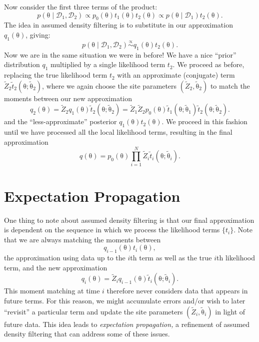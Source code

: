 \documentclass{article}
\newcommand{\given}{\mid}
\newcommand{\mc}[1]{\mathcal{#1}}
\newcommand{\data}{\mc{D}}
\renewcommand{\vec}[1]{\bm{\mathrm{#1}}}
\begin{document}
Now consider the first three terms of the product:
\[
  p(\vec{\theta} \given \data_1, \data_2)
  \propto
  p_0(\vec{\theta})
  t_1(\vec{\theta})
  t_2(\vec{\theta})
  \propto
  p(\vec{\theta} \given \data_1)
  t_2(\vec{\theta}).
\]
The idea in assumed density filtering is to substitute in our
approximation $q_1(\vec{\theta})$, giving:
\[
  p(\vec{\theta} \given \data_1, \data_2)
  \stackrel{\propto}{\sim}
  q_1(\vec{\theta})
  t_2(\vec{\theta}).
\]
Now we are in the same situation we were in before!  We have a nice
``prior'' distribution $q_1$ multiplied by a single likelihood term
$t_2$.  We proceed as before, replacing the true likelihood term $t_2$
with an approximate (conjugate) term $\tilde{Z}_2
\tilde{t}_2(\vec{\theta}; \tilde{\vec{\theta}}_2)$, where we again
choose the site parameters $(\tilde{Z}_2, \tilde{\vec{\theta}}_2)$ to
match the moments between our new approximation
\[
  q_2(\vec{\theta})
  =
  \tilde{Z}_2
  q_1(\vec{\theta})
  \tilde{t}_2(\vec{\theta}; \tilde{\vec{\theta}}_2)
  =
  \tilde{Z}_1
  \tilde{Z}_2
  p_0(\vec{\theta})
  \tilde{t}_1(\vec{\theta}; \tilde{\vec{\theta}}_1)
  \tilde{t}_2(\vec{\theta}; \tilde{\vec{\theta}}_2).
\]
and the ``less-approximate'' posterior
$q_1(\vec{\theta})t_2(\vec{\theta})$.  We proceed in this fashion
until we have processed all the local likelihood terms, resulting
in the final approximation
\[
  q(\vec{\theta})
  =
  p_0(\vec{\theta})
  \prod_{i = 1}^N \tilde{Z}_i \tilde{t}_i(\vec{\theta}; \tilde{\vec{\theta}}_i).
\]

\section*{Expectation Propagation}

One thing to note about assumed density filtering is that our final
approximation is dependent on the sequence in which we process the
likelihood terms $\{t_i\}$.  Note that we are always matching the
moments between
\[
  q_{i-1}(\vec{\theta})t_i(\vec{\theta}),
\]
the approximation using data up to the $i$th term as well as the true
$i$th likelihood term, and the new approximation
\[
  q_i(\vec{\theta})
  =
  \tilde{Z}_i
  q_{i-1}(\vec\theta)
  \tilde{t}_i(\vec{\theta}; \tilde{\vec{\theta}}_i).
\]
This moment matching at time $i$ therefore never considers data that
appears in future terms.  For this reason, we might accumulate errors
and/or wish to later ``revisit'' a particular term and update the site
parameters $(\tilde{Z}_i, \tilde{\vec{\theta}}_i)$ in light of future
data.  This idea leads to \emph{expectation propagation,} a refinement
of assumed density filtering that can address some of these issues.
\end{document}
